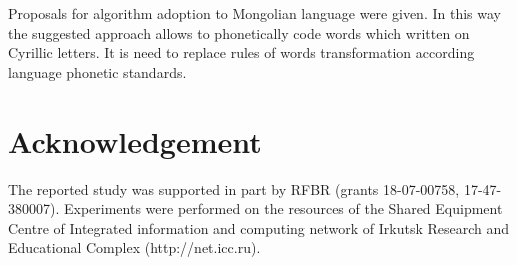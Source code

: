 \documentclass[conference,a4paper]{IEEEtran}
\begin{document}
Proposals for algorithm adoption to Mongolian language were given. In this way the suggested approach allows to phonetically code words which written on Cyrillic letters. It is need to replace rules of words transformation according language phonetic standards.







\section*{Acknowledgement}
The reported study was supported in part by RFBR (grants 18-07-00758, 17-47-380007). Experiments were performed on the resources of the Shared Equipment Centre of Integrated information and computing network of Irkutsk Research and Educational Complex (http://net.icc.ru).






\end{document}
